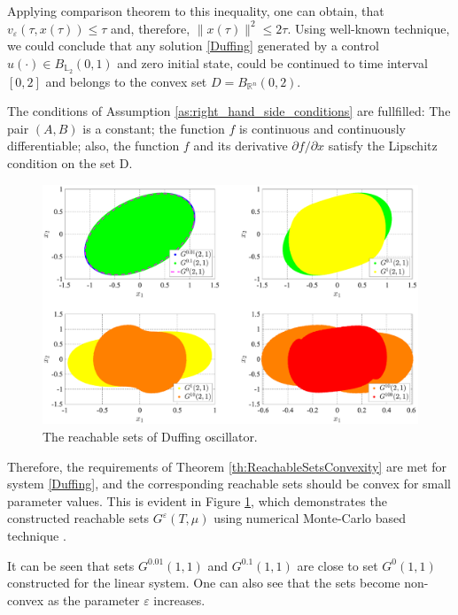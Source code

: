 \documentclass[../main.tex]{subfiles}
\begin{document}
\begin{pr}
	Applying comparison theorem to this inequality, one can obtain, that $v_{\varepsilon}(\tau,x(\tau)) \leqslant \tau$ and, therefore, $\|x(\tau)\|^2 \leqslant 2 \tau$. Using well-known technique, we could conclude that any solution \eqref{Duffing} generated by a control $u(\cdot) \in B_{\mathbb{L}_2}(0,1)$ and zero initial state, could be continued to time interval $[0,2]$ and belongs to the convex set $D = B_{\mathbb{R}^n}(0,2) $.
	
	The conditions of Assumption \ref{as:right_hand_side_conditions} are fullfilled: The pair $(A,B)$ is a constant; the function $f$ is continuous and continuously differentiable; also, the function $f$ and its derivative $\partial f/\partial x$ satisfy the Lipschitz condition on the set D.
	
	\begin{figure}[t]
		\centerline{
			\includegraphics[width=\textwidth]{images/Osipov_QuaziDuffing.eps}}
		\caption{The reachable sets of Duffing oscillator.}
		\label{fig:Duffing}
	\end{figure}
	
	Therefore, the requirements of Theorem \ref{th:ReachableSetsConvexity} are met for system \eqref{Duffing}, and the corresponding reachable sets should be convex for small parameter values. This is evident in Figure \ref{fig:Duffing}, which demonstrates the constructed reachable sets $G^{\varepsilon}(T,\mu) $ using numerical Monte-Carlo based technique \cite{Patent,Zykov}.
	
	It can be seen that sets $G^{0.01}(1,1) $ and $G^{0.1}(1,1) $ are close to set $G^{0}(1,1) $ constructed for the linear system. One can also see that the sets become non-convex as the parameter $\varepsilon$ increases. 
	
\end{pr}  %
\end{document}
